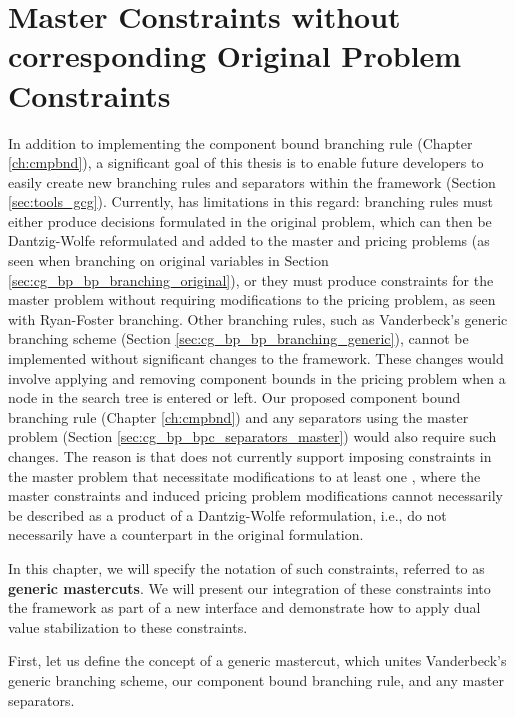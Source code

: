 \chapter{Master Constraints without corresponding Original Problem Constraints}\label{ch:gm}
In addition to implementing the component bound branching rule (Chapter \ref{ch:cmpbnd}), a significant goal of this thesis is to enable future \GCG{} developers to easily create new branching rules and separators within the framework (Section \ref{sec:tools_gcg}). Currently, \GCG{} has limitations in this regard: branching rules must either produce decisions formulated in the original problem, which can then be Dantzig-Wolfe reformulated and added to the master and pricing problems (as seen when branching on original variables in Section \ref{sec:cg_bp_bp_branching_original}), or they must produce constraints for the master problem without requiring modifications to the pricing problem, as seen with Ryan-Foster branching. Other branching rules, such as Vanderbeck's generic branching scheme (Section \ref{sec:cg_bp_bp_branching_generic}), cannot be implemented without significant changes to the \GCG{} framework. These changes would involve applying and removing component bounds in the pricing problem when a node in the search tree is entered or left. Our proposed component bound branching rule (Chapter \ref{ch:cmpbnd}) and any separators using the master problem (Section \ref{sec:cg_bp_bpc_separators_master}) would also require such changes. The reason is that \GCG{} does not currently support imposing constraints in the master problem that necessitate modifications to at least one \SP{}, where the master constraints and induced pricing problem modifications cannot necessarily be described as a product of a Dantzig-Wolfe reformulation, i.e., do not necessarily have a counterpart in the original formulation.

In this chapter, we will specify the notation of such constraints, referred to as \textbf{generic mastercuts}. We will present our integration of these constraints into the \GCG{} framework as part of a new interface and demonstrate how to apply dual value stabilization to these constraints.

First, let us define the concept of a generic mastercut, which unites Vanderbeck's generic branching scheme, our component bound branching rule, and any master separators.


